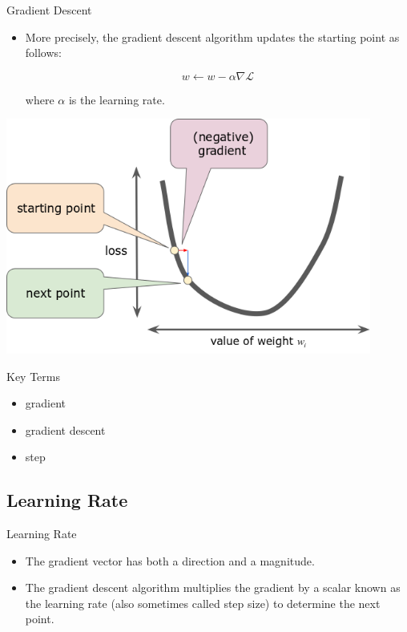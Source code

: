 \documentclass{beamer}
\begin{document}
\begin{frame}{Gradient Descent}
\begin{itemize}
\item More precisely, the gradient descent algorithm updates the starting point as follows:

\vspace{-0.25cm}

$$ w \leftarrow w - \alpha \nabla\mathcal{L} $$

where $\alpha$ is the learning rate.
\end{itemize}
\includegraphics[width=0.9\textwidth]{images/GradientDescentGradientStep.png}
\end{frame}


\begin{frame}{Key Terms}
\begin{itemize}
    \item gradient
    \item gradient descent
    \item step
\end{itemize}
\end{frame}


\subsection{Learning Rate}

\begin{frame}{Learning Rate}
\begin{itemize}
\item The gradient vector has both a direction and a magnitude. 

\medskip
\item The gradient descent algorithm multiplies the gradient by a scalar known as the learning rate (also sometimes called step size) to determine the next point. 
\end{itemize}
\end{frame}
\end{document}
